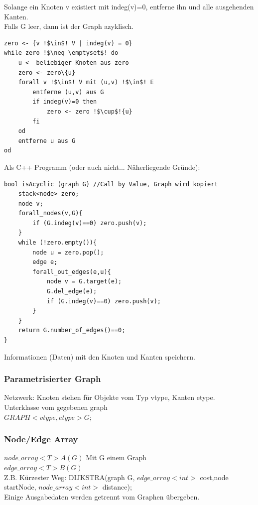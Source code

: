 \documentclass[a4paper]{article}
\begin{document}
\hspace*{1cm}Solange ein Knoten v existiert mit indeg(v)=0, entferne ihn und alle ausgehenden Kanten.\\
\hspace*{1cm}Falls G leer, dann ist der Graph azyklisch.
\begin{lstlisting}[escapechar=!]
zero <- {v !$\in$! V | indeg(v) = 0}
while zero !$\neq \emptyset$! do
	u <- beliebiger Knoten aus zero
	zero <- zero\{u}
	forall v !$\in$! V mit (u,v) !$\in$! E
		entferne (u,v) aus G
		if indeg(v)=0 then
			zero <- zero !$\cup$!{u}
		fi
	od
	entferne u aus G
od
\end{lstlisting}
Als C++ Programm (oder auch nicht... Näherliegende Gründe):
\begin{lstlisting}
bool isAcyclic (graph G) //Call by Value, Graph wird kopiert
	stack<node> zero;
	node v;
	forall_nodes(v,G){
		if (G.indeg(v)==0) zero.push(v);
	}
	while (!zero.empty()){
		node u = zero.pop();
		edge e;
		forall_out_edges(e,u){
			node v = G.target(e);
			G.del_edge(e);
			if (G.indeg(v)==0) zero.push(v);
		}
	}
	return G.number_of_edges()==0;
}
\end{lstlisting}
Informationen (Daten) mit den Knoten und Kanten speichern.\\
\subsubsection*{Parametrisierter Graph}
Netzwerk: Knoten stehen für Objekte vom Typ vtype, Kanten etype.\\
Unterklasse vom gegebenen graph\\
$GRAPH<vtype,etype> G$;
\subsubsection*{Node/Edge Array}
$node\_array<T> A(G)$ Mit G einem Graph\\
$edge\_array<T> B(G)$\\
Z.B. Kürzester Weg: DIJKSTRA(graph G, $edge\_array<int>$ cost,node startNode, $node\_array<int>$ distance);\\
Einige Ausgabedaten werden getrennt vom Graphen übergeben.\\
\end{document}
